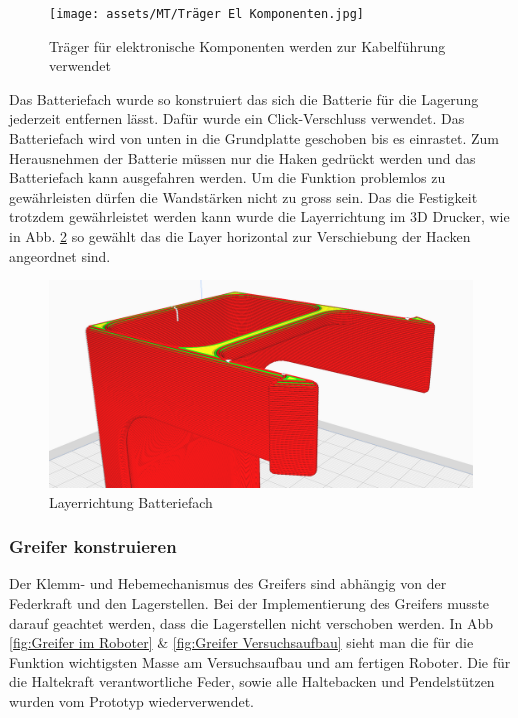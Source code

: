 \begin{figure}[H]
\centering
\texttt{[image: assets/MT/Träger El Komponenten.jpg]}
\caption{Träger für elektronische Komponenten werden zur Kabelführung verwendet}
\label{fig: Träger für elektronische Komponenten}
\end{figure}

Das Batteriefach wurde so konstruiert das sich die Batterie für die Lagerung jederzeit entfernen lässt. Dafür wurde ein Click-Verschluss verwendet. Das Batteriefach wird von unten in die Grundplatte geschoben bis es einrastet. Zum Herausnehmen der Batterie müssen nur die Haken gedrückt werden und das Batteriefach kann ausgefahren werden. Um die Funktion problemlos zu gewährleisten dürfen die Wandstärken nicht zu gross sein. Das die Festigkeit trotzdem gewährleistet werden kann wurde die Layerrichtung im 3D Drucker, wie in Abb. \ref{Layerrichtung Batteriefach} so gewählt das die Layer horizontal zur Verschiebung der Hacken angeordnet sind. 


\begin{figure}[H]
\centering
\includegraphics[width=\textwidth]{assets/MT/Layer_Batterie Fach.png}
\caption{Layerrichtung Batteriefach}
\label{Layerrichtung Batteriefach}
\end{figure}

\subsubsection{Greifer konstruieren}
\label{Greifer konstruieren}

Der Klemm- und Hebemechanismus des Greifers sind abhängig von der Federkraft und den Lagerstellen. Bei der Implementierung des Greifers musste darauf geachtet werden, dass die Lagerstellen nicht verschoben werden. In Abb \ref{fig:Greifer im Roboter} \& \ref{fig:Greifer Versuchsaufbau} sieht man die für die Funktion wichtigsten Masse am Versuchsaufbau und am fertigen Roboter. Die für die Haltekraft verantwortliche Feder, sowie alle Haltebacken und Pendelstützen wurden vom Prototyp wiederverwendet. 

